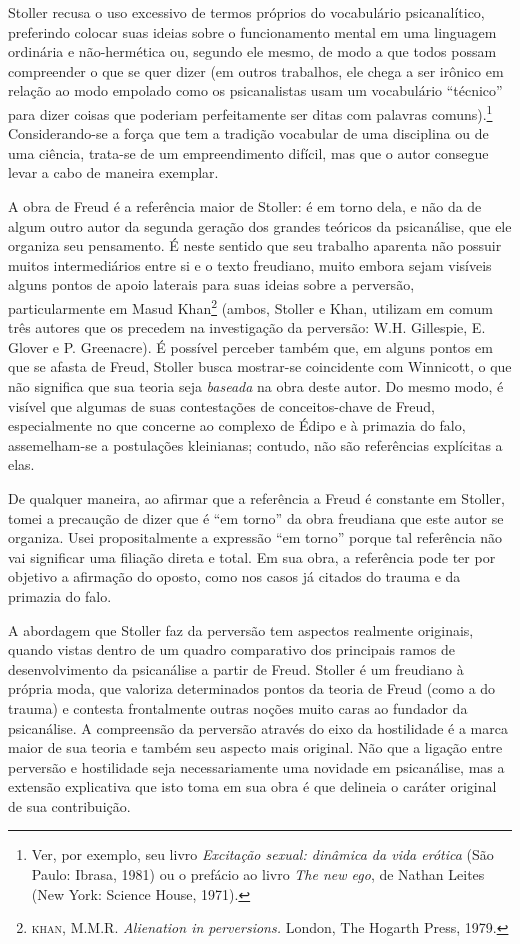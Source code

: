 Stoller recusa o uso excessivo de termos próprios do vocabulário
psicanalítico, preferindo colocar suas ideias sobre o funcionamento
mental em uma linguagem ordinária e não-hermética ou, segundo ele mesmo,
de modo a que todos possam compreender o que se quer dizer (em outros
trabalhos, ele chega a ser irônico em relação ao modo empolado como os
psicanalistas usam um vocabulário ``técnico'' para dizer coisas que
poderiam perfeitamente ser ditas com palavras comuns).\footnote{Ver, por
  exemplo, seu livro \emph{Excitação sexual: dinâmica da vida erótica}
  (São Paulo: Ibrasa, 1981) ou o prefácio ao livro \emph{The new ego},
  de Nathan Leites (New York: Science House, 1971).} Considerando-se a
força que tem a tradição vocabular de uma disciplina ou de uma ciência,
trata-se de um empreendimento difícil, mas que o autor consegue levar a
cabo de maneira exemplar.

A obra de Freud é a referência maior de Stoller: é em torno dela, e não
da de algum outro autor da segunda geração dos grandes teóricos da
psicanálise, que ele organiza seu pensamento. É neste sentido que seu
trabalho aparenta não possuir muitos intermediários entre si e o texto
freudiano, muito embora sejam visíveis alguns pontos de apoio laterais
para suas ideias sobre a perversão, particularmente em Masud
Khan\footnote{\textsc{khan}, M.M.R. \emph{Alienation in perversions.}
  London, The Hogarth Press, 1979.} (ambos, Stoller e Khan, utilizam em
comum três autores que os precedem na investigação da perversão: W.H.
Gillespie, E. Glover e P. Greenacre). É possível perceber também que, em
alguns pontos em que se afasta de Freud, Stoller busca mostrar-se
coincidente com Winnicott, o que não significa que sua teoria seja
\emph{baseada} na obra deste autor. Do mesmo modo, é visível que algumas
de suas contestações de conceitos-chave de Freud, especialmente no que
concerne ao complexo de Édipo e à primazia do falo, assemelham-se a
postulações kleinianas; contudo, não são referências explícitas a elas.

De qualquer maneira, ao afirmar que a referência a Freud é constante em
Stoller, tomei a precaução de dizer que é ``em torno'' da obra freudiana
que este autor se organiza. Usei propositalmente a expressão ``em
torno'' porque tal referência não vai significar uma filiação direta e
total. Em sua obra, a referência pode ter por objetivo a afirmação do
oposto, como nos casos já citados do trauma e da primazia do falo.

A abordagem que Stoller faz da perversão tem aspectos realmente
originais, quando vistas dentro de um quadro comparativo dos principais
ramos de desenvolvimento da psicanálise a partir de Freud. Stoller é um
freudiano à própria moda, que valoriza determinados pontos da teoria de
Freud (como a do trauma) e contesta frontalmente outras noções muito
caras ao fundador da psicanálise. A compreensão da perversão através do
eixo da hostilidade é a marca maior de sua teoria e também seu aspecto
mais original. Não que a ligação entre perversão e hostilidade seja
necessariamente uma novidade em psicanálise, mas a extensão explicativa
que isto toma em sua obra é que delineia o caráter original de sua
contribuição.

